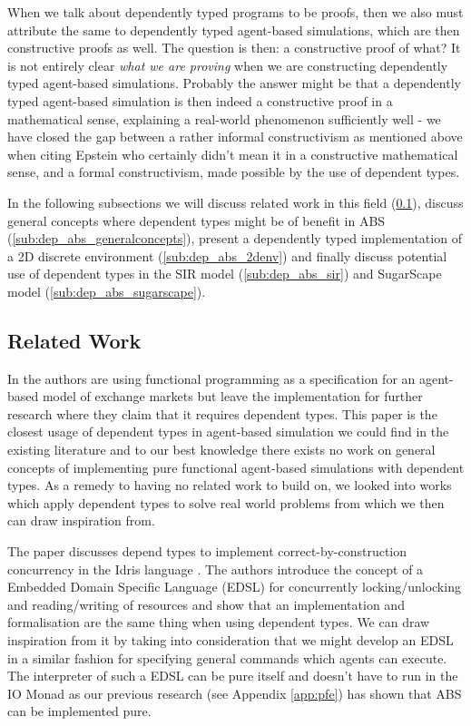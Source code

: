 When we talk about dependently typed programs to be proofs, then we also must attribute the same to dependently typed agent-based simulations, which are then constructive proofs as well. The question is then: a constructive proof of what? It is not entirely clear \textit{what we are proving} when we are constructing dependently typed agent-based simulations. Probably the answer might be that a dependently typed agent-based simulation is then indeed a constructive proof in a mathematical sense, explaining a real-world phenomenon sufficiently well - we have closed the gap between a rather informal constructivism as mentioned above when citing Epstein who certainly didn't mean it in a constructive mathematical sense, and a formal constructivism, made possible by the use of dependent types.

In the following subsections we will discuss related work in this field (\ref{sub:dep_abs_relwork}), discuss general concepts where dependent types might be of benefit in ABS (\ref{sub:dep_abs_generalconcepts}), present a dependently typed implementation of a 2D discrete environment (\ref{sub:dep_abs_2denv}) and finally discuss potential use of dependent types in the SIR model (\ref{sub:dep_abs_sir}) and SugarScape model (\ref{sub:dep_abs_sugarscape}).

\subsection{Related Work}
\label{sub:dep_abs_relwork}
In \cite{botta_functional_2011} the authors are using functional programming as a specification for an agent-based model of exchange markets but leave the implementation for further research where they claim that it requires dependent types. This paper is the closest usage of dependent types in agent-based simulation we could find in the existing literature and to our best knowledge there exists no work on general concepts of implementing pure functional agent-based simulations with dependent types. As a remedy to having no related work to build on, we looked into works which apply dependent types to solve real world problems from which we then can draw inspiration from. 

The paper \cite{brady_correct-by-construction_2010} discusses depend types to implement correct-by-construction concurrency in the Idris language \cite{brady_idris_2013}. The authors introduce the concept of a Embedded Domain Specific Language (EDSL) for concurrently locking/unlocking and reading/writing of resources and show that an implementation and formalisation are the same thing when using dependent types. We can draw inspiration from it by taking into consideration that we might develop an EDSL in a similar fashion for specifying general commands which agents can execute. The interpreter of such a EDSL can be pure itself and doesn't have to run in the IO Monad as our previous research (see Appendix \ref{app:pfe}) has shown that ABS can be implemented pure.

